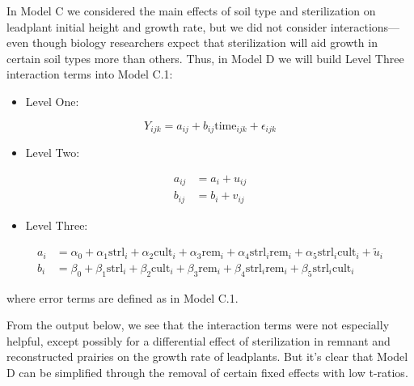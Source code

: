 \documentclass[
]{krantz}
\providecommand{\tightlist}{%
  \setlength{\itemsep}{0pt}\setlength{\parskip}{0pt}}
\begin{document}
In Model C we considered the main effects of soil type and sterilization on leadplant initial height and growth rate, but we did not consider interactions---even though biology researchers expect that sterilization will aid growth in certain soil types more than others. Thus, in Model D we will build Level Three interaction terms into Model C.1:

\begin{itemize}
\tightlist
\item
  Level One:
\end{itemize}

\begin{equation*}
Y_{ijk} = a_{ij}+b_{ij}\textrm{time}_{ijk}+\epsilon_{ijk}
\end{equation*}

\begin{itemize}
\tightlist
\item
  Level Two:
\end{itemize}

\begin{align*}
a_{ij} & = a_{i}+u_{ij} \\
b_{ij} & = b_{i}+v_{ij}
\end{align*}

\begin{itemize}
\tightlist
\item
  Level Three:
\end{itemize}

\begin{align*}
a_{i} & = \alpha_{0} + \alpha_{1}\textrm{strl}_{i} + \alpha_{2}\textrm{cult}_{i} + \alpha_{3}\textrm{rem}_{i} + \alpha_{4}\textrm{strl}_{i}\textrm{rem}_{i} + \alpha_{5}\textrm{strl}_{i}\textrm{cult}_{i} + \tilde{u}_{i} \\
b_{i} & = \beta_{0}+\beta_{1}\textrm{strl}_{i}+\beta_{2}\textrm{cult}_{i}+\beta_{3}\textrm{rem}_{i} + \beta_{4}\textrm{strl}_{i}\textrm{rem}_{i} + \beta_{5}\textrm{strl}_{i}\textrm{cult}_{i}
\end{align*}

where error terms are defined as in Model C.1.

From the output below, we see that the interaction terms were not especially helpful, except possibly for a differential effect of sterilization in remnant and reconstructed prairies on the growth rate of leadplants. But it's clear that Model D can be simplified through the removal of certain fixed effects with low t-ratios.
\end{document}
